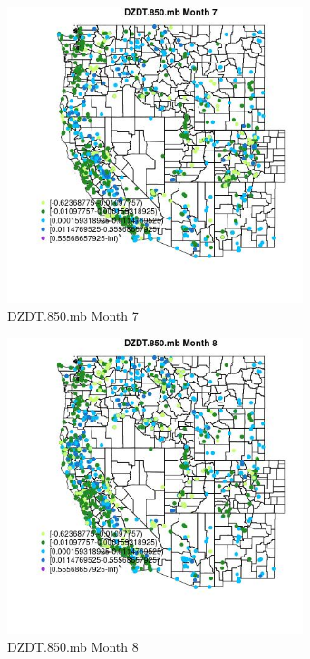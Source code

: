 \begin{figure} 
\centering  
\includegraphics[width=0.77\textwidth]{Code_Outputs/Report_ML_input_PM25_Step4_part_f_de_duplicated_aves_prioritize_24hr_obswNAs_MapObsMo7DZDT850mb.jpg} 
\caption{\label{fig:Report_ML_input_PM25_Step4_part_f_de_duplicated_aves_prioritize_24hr_obswNAsMapObsMo7DZDT850mb}DZDT.850.mb Month 7} 
\end{figure} 
 

\clearpage 

\begin{figure} 
\centering  
\includegraphics[width=0.77\textwidth]{Code_Outputs/Report_ML_input_PM25_Step4_part_f_de_duplicated_aves_prioritize_24hr_obswNAs_MapObsMo8DZDT850mb.jpg} 
\caption{\label{fig:Report_ML_input_PM25_Step4_part_f_de_duplicated_aves_prioritize_24hr_obswNAsMapObsMo8DZDT850mb}DZDT.850.mb Month 8} 
\end{figure} 
 

